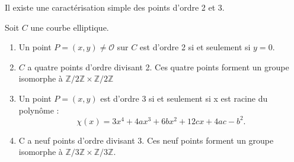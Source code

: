\documentclass[a4paper]{article}
\begin{document}
\noindent Il existe une caractérisation simple des points d'ordre 2 et 3.

\begin{theorem}
Soit $C$ une courbe elliptique.
\begin{enumerate}
\item Un point $P=(x,y)\neq \mathcal{O}$ sur $C$ est d'ordre 2 si et seulement si $y=0$.
\item $C$ a quatre points d'ordre divisant 2.
Ces quatre points forment un groupe isomorphe à $\mathbb{Z}/2\mathbb{Z} \times \mathbb{Z}/2\mathbb{Z}$
\item Un point $P=(x,y)$ est d'ordre 3 si et seulement si x est racine du polynôme :
\begin{equation*}
\chi(x)= 3x^4+4ax^3+6bx^2+12cx+4ac-b^2.
\end{equation*}
\item C a neuf points d'ordre divisant 3. Ces neuf points  forment un groupe isomorphe à 
$\mathbb{Z}/3\mathbb{Z} \times \mathbb{Z}/3\mathbb{Z}$.
\end{enumerate}
\end{theorem}
\end{document}
